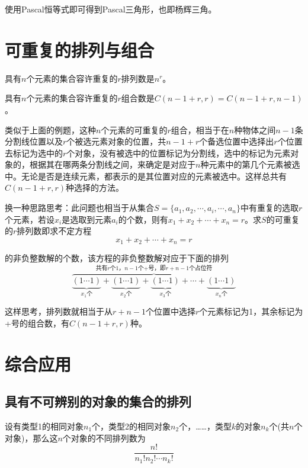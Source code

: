 \documentclass[cyan]{elegantnote}
\begin{document}
\begin{note}
   使用Pascal恒等式即可得到Pascal三角形，也即杨辉三角。
\end{note}

\section{可重复的排列与组合}
\begin{newthem}[可重复的排列数]
   具有$n$个元素的集合容许重复的$r$排列数是$n^r$。
\end{newthem}
\begin{newthem}[可重复的组合数]
   具有$n$个元素的集合容许重复的$r$组合数是$C(n-1+r,r)=C(n-1+r,n-1)$。
\end{newthem}
\begin{newproof}

   类似于上面的例题，这种$n$个元素的可重复的$r$组合，相当于在$n$种物体之间$n-1$条分割线位置以及$r$个被选元素对象的位置，共$n-1+r$个备选位置中选择出$r$个位置去标记为选中的$r$个对象，没有被选中的位置标记为分割线，选中的标记为元素对象的，根据其在哪两条分割线之间，来确定是对应于$n$种元素中的第几个元素被选中。无论是否是连续元素，都表示的是其位置对应的元素被选中。这样总共有$C(n-1+r,r)$种选择的方法。
\end{newproof}
\newpage
\begin{newproof}
   
   换一种思路思考：此问题也相当于从集合$S=\{a_1,a_2,\cdots,a_i,\cdots,a_n\}$中有重复的选取$r$个元素，若设$x_i$是选取到元素$a_i$的个数，则有$x_1+x_2+\cdots+x_n=r$。求$S$的可重复的$r$排列数即求不定方程
   \[x_1+x_2+\cdots+x_n=r\]
   
   的非负整数解的个数，该方程的非负整数解对应于下面的排列
   \[
      \overbrace{
      \underbrace{(1\cdots1)}_{\text{$x_1$个}}+
      \underbrace{(1\cdots1)}_{\text{$x_2$个}}+
      \underbrace{(1\cdots1)}_{\text{$x_3$个}}+
      \cdots+
      \underbrace{(1\cdots1)}_{\text{$x_n$个}}
      }^{\text{共有$r$个1，$n-1$个+号，即$r+n-1$个占位符}}
   \]

   这样思考，排列数就相当于从$r+n-1$个位置中选择$r$个元素标记为1，其余标记为+号的组合数，有$C(n-1+r,r)$种。

\end{newproof}

\section{综合应用}
\subsection{具有不可辨别的对象的集合的排列}
\begin{newthem}[具有不可辨别的对象的集合的排列]
设有类型1的相同对象$n_1$个，类型2的相同对象$n_2$个，……，类型$k$的对象$n_k$个(共$n$个对象)，那么这$n$个对象的不同排列数为
\[\frac{n!}{n_1!n_2!\cdots{}n_k!}\]
\end{newthem}
\end{document}

